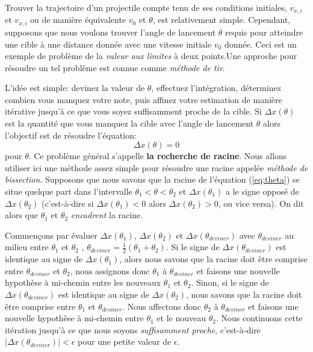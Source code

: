 \documentclass[%
oneside,                 %
final,                   %
10pt]{article}
\begin{document}
Trouver la trajectoire d'un projectile compte tenu de ses conditions initiales, $v_{x,i}$ et $v_{x,i}$ ou de manière équivalente $v_0$ et $\theta$, est relativement simple. Cependant, supposons que nous voulons trouver l'angle de lancement $\theta$ requis pour atteindre une cible à une distance donnée avec une vitesse initiale $v_0$ donnée. Ceci est un exemple de problème de la \emph{valeur aux limites} à deux points.Une approche pour résoudre un tel problème est connue comme \emph{méthode de tir}.

L'idée est simple: devinez la valeur de $\theta$, effectuez l'intégration, déterminez combien vous manquez votre note, puis affinez votre estimation de manière itérative jusqu’à ce que vous soyez suffisamment proche de la cible. Si $\Delta x(\theta)$ est la quantité que vous manquez la cible avec l'angle de lancement $\theta$ alors l'objectif est de résoudre l'équation:
\begin{equation} \label{eq:theta}
\Delta x(\theta) = 0
\end{equation}
pour $\theta$. Ce problème général s'appelle \textbf{la recherche de racine}. Nous allons utiliser ici une méthode assez simple pour résoudre une racine appelée \emph{méthode de bissection}. Supposons que nous savons que la racine de l'équation (\ref{eq:theta}) se situe quelque part dans l'intervalle $\theta_1 < \theta < \theta_2$ et $\Delta x(\theta_1)$ a le signe opposé de $\Delta x(\theta_2)$ (c'est-à-dire si $\Delta x(\theta_1) <0$ alors $\Delta x(\theta_2)> 0$, ou vice versa). On dit alors que $\theta_1$ et $\theta_2$ \emph{encadrent} la racine.

Commençons par évaluer $\Delta x(\theta_1)$, $\Delta x(\theta_2)$ et $\Delta x(\theta_{deviner})$ avec  $\theta_{deviner}$ au milieu entre  $\theta_1$  et  $\theta_2$ , $\theta_{deviner} = \frac{1}{2} (\theta_1 + \theta_2)$. Si le signe de $\Delta x(\theta_{deviner})$ est identique au signe de $\Delta x(\theta_1)$, alors nous savons que la racine doit être comprise entre $\theta_{deviner}$ et $\theta_2$, nous assignons donc $\theta_1$ à $\theta_{deviner}$ et faisons une nouvelle hypothèse à mi-chemin entre les nouveaux $\theta_1$ et $\theta_2$. Sinon, si le signe de $\Delta x(\theta_{deviner})$ est identique au signe de $\Delta x(\theta_2)$, nous savons que la racine doit être comprise entre $\theta_1$ et $\theta_{deviner}$. Nous affectons donc $\theta_2$ à $\theta_{deviner}$ et faisons une nouvelle hypothèse à mi-chemin entre $\theta_1$ et le nouveau $\theta_2$. Nous continuons cette itération jusqu'à ce que nous soyons \emph{suffisamment proche}, c'est-à-dire $| \Delta x(\theta_{deviner}) | < \epsilon$ pour une petite valeur de $\epsilon$.
\end{document}

